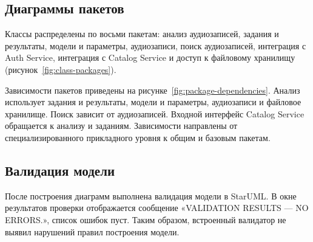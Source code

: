 \begin{reportSheet}
\subsection{Диаграммы пакетов}

Классы распределены по восьми пакетам: анализ аудиозаписей, задания
и результаты, модели и параметры, аудиозаписи, поиск аудиозаписей,
интеграция с Auth Service, интеграция с Catalog Service и доступ
к файловому хранилищу (рисунок~\ref{fig:class-packages}).

Зависимости пакетов приведены на рисунке~\ref{fig:package-dependencies}.
Анализ использует задания и результаты, модели и параметры, аудиозаписи
и файловое хранилище. Поиск зависит от аудиозаписей. Входной интерфейс
Catalog Service обращается к анализу и заданиям. Зависимости направлены
от специализированного прикладного уровня к общим и базовым пакетам.

\end{reportSheet}

\subsection{Валидация модели}

После построения диаграмм выполнена валидация модели в StarUML.
В окне результатов проверки отображается сообщение
«VALIDATION RESULTS --- NO ERRORS.», список ошибок пуст.
Таким образом, встроенный валидатор не выявил нарушений правил
построения модели.
